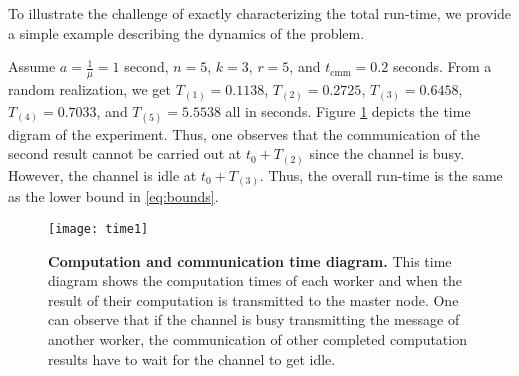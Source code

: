 \documentclass[onecolumn,journal,twoside]{IEEEtran}
\begin{document}
To illustrate the challenge of exactly characterizing the total run-time, we provide a simple example describing the dynamics of the problem.

\begin{example}
Assume $a=\frac{1}{\mu}=1$ second, $n=5$, $k=3$, $r=5$, and $t_{\text{cmm}}=0.2$ seconds. From a random realization, we get $T_{(1)}=0.1138$, $T_{(2)}=0.2725$, $T_{(3)}=0.6458$, $T_{(4)}=0.7033$, and $T_{(5)}=5.5538$ all in seconds. Figure \ref{fig:timing} depicts the time digram of the experiment. Thus, one observes that the communication of the second result cannot be carried out at $t_0 + T_{(2)}$ since the channel is busy. However, the channel is idle at $t_0 + T_{(3)}$. Thus, the overall run-time is the same as the lower bound in \eqref{eq:bounds}.

\begin{figure}[h]
\begin{center}
\texttt{[image: time1]}
    \caption{\small{\textbf{Computation and communication time diagram.} This time diagram shows the computation times of each worker and when the result of their computation is transmitted to the master node. One can observe that if the channel is busy transmitting the message of another worker, the communication of other completed computation results have to wait for the channel to get idle.}}
    \label{fig:timing}
    \end{center}
\end{figure}

\end{example}
\end{document}
